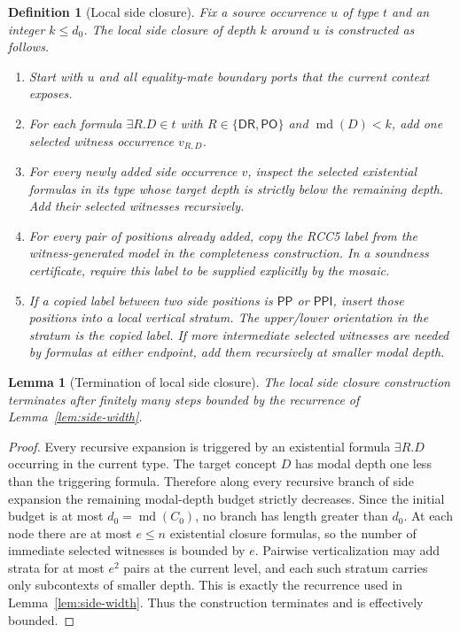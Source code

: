 \documentclass[11pt]{article}
\newtheorem{lemma}[theorem]{Lemma}
\newtheorem{definition}[theorem]{Definition}
\newcommand{\DR}{\mathsf{DR}}
\newcommand{\PO}{\mathsf{PO}}
\newcommand{\PP}{\mathsf{PP}}
\newcommand{\PPI}{\mathsf{PPI}}
\newcommand{\md}{\operatorname{md}}
\begin{document}
\begin{definition}[Local side closure]
Fix a source occurrence $u$ of type $t$ and an integer $k\le d_0$.  The local side closure of depth $k$ around $u$ is constructed as follows.
\begin{enumerate}[label=(LC\arabic*)]
\item Start with $u$ and all equality-mate boundary ports that the current context exposes.
\item For each formula $\exists R.D\in t$ with $R\in\{\DR,\PO\}$ and $\md(D)<k$, add one selected witness occurrence $v_{R,D}$.
\item For every newly added side occurrence $v$, inspect the selected existential formulas in its type whose target depth is strictly below the remaining depth.  Add their selected witnesses recursively.
\item For every pair of positions already added, copy the RCC5 label from the witness-generated model in the completeness construction.  In a soundness certificate, require this label to be supplied explicitly by the mosaic.
\item If a copied label between two side positions is $\PP$ or $\PPI$, insert those positions into a local vertical stratum.  The upper/lower orientation in the stratum is the copied label.  If more intermediate selected witnesses are needed by formulas at either endpoint, add them recursively at smaller modal depth.
\end{enumerate}
\end{definition}

\begin{lemma}[Termination of local side closure]
The local side closure construction terminates after finitely many steps bounded by the recurrence of Lemma~\ref{lem:side-width}.
\end{lemma}

\begin{proof}
Every recursive expansion is triggered by an existential formula $\exists R.D$ occurring in the current type.  The target concept $D$ has modal depth one less than the triggering formula.  Therefore along every recursive branch of side expansion the remaining modal-depth budget strictly decreases.  Since the initial budget is at most $d_0=\md(C_0)$, no branch has length greater than $d_0$.  At each node there are at most $e\le n$ existential closure formulas, so the number of immediate selected witnesses is bounded by $e$.  Pairwise verticalization may add strata for at most $e^2$ pairs at the current level, and each such stratum carries only subcontexts of smaller depth.  This is exactly the recurrence used in Lemma~\ref{lem:side-width}.  Thus the construction terminates and is effectively bounded.
\end{proof}
\end{document}
